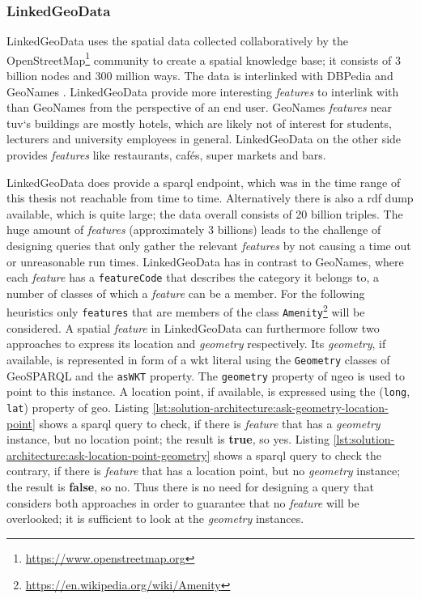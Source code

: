 \documentclass[draft,final]{vutinfth} %
\begin{document}
\subsubsection{LinkedGeoData}
LinkedGeoData uses the spatial data collected collaboratively by the OpenStreetMap\footnote{\url{https://www.openstreetmap.org}} community to create a spatial knowledge base; it consists of 3 billion nodes and 300 million ways. The data is interlinked with DBPedia and GeoNames \cite{universitat_leipzig:_agile_knowledge_engineering_and_semantic_web_linkedgeodata.org_????}. LinkedGeoData provide more interesting \textit{features} to interlink with than GeoNames from the perspective of an end user. GeoNames \textit{features} near \gls{tuv}`s buildings are mostly hotels, which are likely not of interest for students, lecturers and university employees in general. LinkedGeoData on the other side provides \textit{features} like restaurants, cafés, super markets and bars. 

LinkedGeoData does provide a \gls{sparql} endpoint, which was in the time range of this thesis not reachable from time to time. Alternatively there is also a \gls{rdf} dump available, which is quite large; the data overall consists of 20 billion triples. The huge amount of \textit{features} (approximately 3 billions) leads to the challenge of designing queries that only gather the relevant \textit{features} by not causing a time out or unreasonable run times. LinkedGeoData has in contrast to GeoNames, where each \textit{feature} has a \texttt{featureCode} that describes the category it belongs to, a number of classes of which a \textit{feature} can be a member. For the following heuristics only \texttt{features} that are members of the class \texttt{Amenity}\footnote{\url{https://en.wikipedia.org/wiki/Amenity}} will be considered. A spatial \textit{feature} in LinkedGeoData can furthermore follow two approaches to express its location and \textit{geometry} respectively. Its \textit{geometry}, if available, is represented in form of a \gls{wkt} literal using the \texttt{Geometry} classes of GeoSPARQL and the \texttt{asWKT} property. The \texttt{geometry} property of \gls{ngeo} is used to point to this instance. A location point, if available, is expressed using the (\texttt{long}, \texttt{lat}) property of \gls{geo}. Listing \ref{lst:solution-architecture:ask-geometry-location-point} shows a \gls{sparql} query to check, if there is \textit{feature} that has a \textit{geometry} instance, but no location point; the result is \textbf{true}, so yes. Listing \ref{lst:solution-architecture:ask-location-point-geometry} shows a \gls{sparql} query to check the contrary, if there is \textit{feature} that has a location point, but no \textit{geometry} instance; the result is \textbf{false}, so no. Thus there is no need for designing a query that considers both approaches in order to guarantee that no \textit{feature} will be overlooked; it is sufficient to look at the \textit{geometry} instances.
\end{document}
